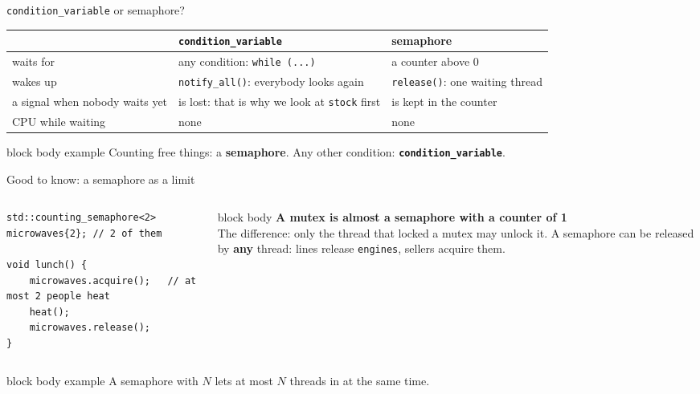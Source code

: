 \documentclass[aspectratio=169,10pt]{beamer}
\newcommand{\stepbox}[2]{%
  \begin{beamercolorbox}[rounded=true,sep=0.09cm,wd=\linewidth]{block body}
    \footnotesize\textbf{#1}\\ #2
  \end{beamercolorbox}\vspace{0.06cm}}
\newcommand{\keymsg}[1]{%
  \begin{beamercolorbox}[rounded=true,sep=0.1cm,wd=\textwidth]{block body example}
    \centering\footnotesize #1
  \end{beamercolorbox}}
\begin{document}
\begin{frame}{\texttt{condition\_variable} or semaphore?}
  \vfill
  \begin{center}
    \footnotesize
    \renewcommand{\arraystretch}{1.4}
    \begin{tabular}{@{}l l l@{}}
      \toprule
       & \textbf{\texttt{condition\_variable}} & \textbf{semaphore} \\
      \midrule
      waits for & any condition: \texttt{while (...)} & a counter above 0 \\
      wakes up & \texttt{notify\_all()}: everybody looks again & \texttt{release()}: one waiting thread \\
      a signal when nobody waits yet & is lost: that is why we look at \texttt{stock} first & is kept in the counter \\
      CPU while waiting & none & none \\
      \bottomrule
    \end{tabular}
  \end{center}
  \vfill
  \keymsg{Counting free things: a \textbf{semaphore}. Any other condition: \textbf{\texttt{condition\_variable}}.}
\end{frame}

\begin{frame}[fragile]{Good to know: a semaphore as a limit}
  \begin{columns}[T,onlytextwidth]
\begin{lstlisting}[style=cpp]
std::counting_semaphore<2> microwaves{2}; // 2 of them

void lunch() {
    microwaves.acquire();   // at most 2 people heat
    heat();
    microwaves.release();
}
\end{lstlisting}
      \stepbox{A mutex is almost a semaphore with a counter of 1}{The difference: only the thread that locked a
        mutex may unlock it. A semaphore can be released by \textbf{any} thread: lines release \texttt{engines},
        sellers acquire them.}
  \end{columns}
  \vfill
  \keymsg{A semaphore with $N$ lets at most $N$ threads in at the same time.}
\end{frame}
\end{document}
